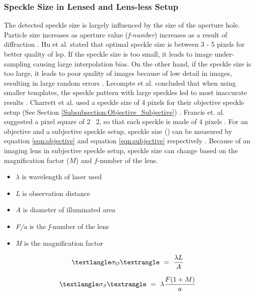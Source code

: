     \subsubsection{Speckle Size in Lensed and Lens-less Setup}\label{Subsubsection:Speckle_Size}
    The detected speckle size is largely influenced by the size of the aperture hole. Particle size increases as aperture value (\emph{f-number}) increases as a result of diffraction \cite{song}. Hu et al. stated that optimal speckle size is between 3 - 5 pixels for better quality of \gls{lsp}. If the speckle size is too small, it leads to image under-sampling causing large interpolation bias. On the other hand, if the speckle size is too large, it leads to poor quality of images because of low detail in images, resulting in large random errors \cite{hu}. Lecompte et al. concluded that when using smaller templates, the speckle pattern with large speckles led to most inaccurate results \cite{lecompte}. Charrett et al. used a speckle size of 4 pixels for their objective speckle setup (See Section \ref{Subsubsection:Objective_Subjective}) \cite{charrett_2019}. Francis et. al. suggested a pixel square of 2 \times\ 2, so that each speckle is made of 4 pixels \cite{francis_autonomous}. For an objective and a subjective speckle setup, speckle size (\sigma) can be measured by equation \ref{eqn:objective} and equation \ref{eqn:subjective} respectively \cite{cloud}. Because of an imaging lens in subjective speckle setup, speckle size can change based on the magnification factor ($M$) and $f$-number of the lens. 
    
    \vspace{5mm}
    \begin{itemize}
        \item $\lambda$ is wavelength of laser used
        \item \emph{L} is observation distance
        \item \emph{A} is diameter of illuminated area
        \item \emph{F/a} is the \emph{f}-number of the lens
        \item \emph{M} is the magnification factor
    \end{itemize}

    \begin{equation}\label{eqn:objective}
        \textlangle \sigma_O \textrangle \ = \  \frac{\lambda L}{A}
    \end{equation}

    \begin{equation}\label{eqn:subjective}
        \textlangle \sigma_S \textrangle \ = \  \lambda \frac{F(1 + M)}{a}
    \end{equation}

